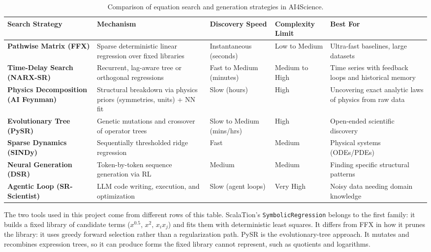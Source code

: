 \documentclass[11pt]{article}
\begin{document}
\begin{table}[H]
\centering
\caption{Comparison of equation search and generation strategies in
AI4Science.}
\label{tab:sr-strategies}
\small
\setlength{\tabcolsep}{4pt}
\renewcommand{\arraystretch}{1.15}
\begin{tabular}{L{0.16\textwidth}L{0.25\textwidth}L{0.15\textwidth}L{0.12\textwidth}L{0.21\textwidth}}
\toprule
\textbf{Search Strategy} & \textbf{Mechanism} & \textbf{Discovery Speed} & \textbf{Complexity Limit} & \textbf{Best For} \\
\midrule
\textbf{Pathwise Matrix (FFX)} & Sparse deterministic linear regression over fixed libraries & Instantaneous (seconds) & Low to Medium & Ultra-fast baselines, large datasets \\ \addlinespace[3pt]
\textbf{Time-Delay Search (NARX-SR)} & Recurrent, lag-aware tree or orthogonal regressions & Fast to Medium (minutes) & Medium to High & Time series with feedback loops and historical memory \\ \addlinespace[3pt]
\textbf{Physics Decomposition (AI Feynman)} & Structural breakdown via physics priors (symmetries, units) + NN fit & Slow (hours) & High & Uncovering exact analytic laws of physics from raw data \\ \addlinespace[3pt]
\textbf{Evolutionary Tree (PySR)} & Genetic mutations and crossover of operator trees & Slow to Medium (mins/hrs) & High & Open-ended scientific discovery \\ \addlinespace[3pt]
\textbf{Sparse Dynamics (SINDy)} & Sequentially thresholded ridge regression & Fast & Medium & Physical systems (ODEs/PDEs) \\ \addlinespace[3pt]
\textbf{Neural Generation (DSR)} & Token-by-token sequence generation via RL & Medium & Medium & Finding specific structural patterns \\ \addlinespace[3pt]
\textbf{Agentic Loop (SR-Scientist)} & LLM code writing, execution, and optimization & Slow (agent loops) & Very High & Noisy data needing domain knowledge \\
\bottomrule
\end{tabular}
\end{table}

\begin{sloppypar}
The two tools used in this project come from different rows of this table.
ScalaTion's \texttt{SymbolicRegression} belongs to the first family: it builds
a fixed library of candidate terms ($x^{0.5}$, $x^2$, $x_ix_j$) and fits them
with deterministic least squares. It differs from FFX in how it prunes the
library: it uses greedy forward selection rather than a regularization path.
PySR is the evolutionary-tree approach. It mutates and recombines expression
trees, so it can produce forms the fixed library cannot represent, such as
quotients and logarithms.
\end{sloppypar}
\end{document}
